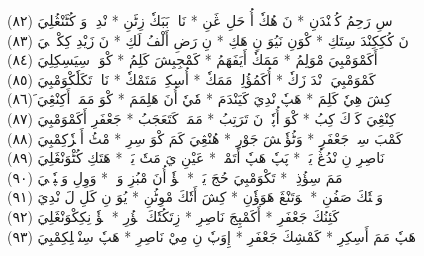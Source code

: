 \documentclass[a4paper, 10pt]{report}
\begin{document}
\begin{center}
\textarabic{(٨٢) \textcolor{mygreen}{سِ رَحِمُ كُئٖنْدَنِ  * نَ هُكٗ أُ حَلِ ڠَنِ  * نَاءٖ بَبَكٗ زِٹَنِ  * نْدِيٖ وَ كُٹَنْڠُلِيَ }} 
\\[5mm] 

\textarabic{(٨٣) \textcolor{mygreen}{نَ كُكِكِنْدَ سِتَكِ  * كْوَنِ نَيُوَ نِ هَكِ  * نِ رَضِ أَلْفُ لَكِ  * نَ زَيْدِ كِكْوٖٹٖيَ }} 
\\[5mm] 

\textarabic{(٨٤) \textcolor{mygreen}{أَكَمْوَمْبِيَ مْوَلِمُ  * مَمَكٗ أَيَفَهَمُ  * كَمْجِبِشَ كَلِمُ  * كْوَكٖ سِيَسِكِلِيَ }} 
\\[5mm] 

\textarabic{(٨٥) \textcolor{mygreen}{كَمْوَمْبِيَ إٖنْدَ زَكٗ  * أُكَمُؤُلِزٖ مَمَكٗ  * أُسِكِزٖ مَتَمْكٗ  * نَاءٖ تَكَلٗكْوَمْبِيَ }} 
\\[5mm] 

\textarabic{(٨٦) \textcolor{mygreen}{َكِشَ هِيٗ كَلِمَ  * هَپٗ نْدِيَ كَيَنْدَمَ  * مٗيٗ أُنَ هَلِمَمَ  * كْوَ مَمَكٖ أَكِنْڠِيَ }} 
\\[5mm] 

\textarabic{(٨٧) \textcolor{mygreen}{كِنْڠِيَ كَوٖكَ كِبُ  * كْوَ أُپٗلٖ نَ تَرَتِبُ  * مَمَكٖ كَتَعَجَبُ  * جَعْفَرِ أَكَمْوَمْبِيَ }} 
\\[5mm] 

\textarabic{(٨٨) \textcolor{mygreen}{كَمْبَ سِوٖ جَعْفَرِ  * وَٹُؤٗنٖشَ جَوْرِ  * هُنْڠِيَ كَمَ كْوَ سِرِ  * مْٹُ أَمٖزٗكِمْبِيَ }} 
\\[5mm] 

\textarabic{(٨٩) \textcolor{mygreen}{نَاصِرِ نِ نْدُڠُ يَكٖ  * پَپٗ هَپٗ أَتَمْكٖ  * عَيْنِ يَ مَتٗ يَكٖ  * هَتَكِ كُٹْوَنْڠَلِيَ }} 
\\[5mm] 

\textarabic{(٩٠) \textcolor{mygreen}{إٖوٖ مَمَ سِؤُذِكٖ  * تَكْوَمْبِيَ حُجَ يَكٖ  * يٖؤٗ أُنَ مْبُزِ وَكٖ  * وَوِلِ وَمٖپٗتٖيَ }} 
\\[5mm] 

\textarabic{(٩١) \textcolor{mygreen}{وَمٖتٗكَ صَفُنِ  * مٖوَتَنْڠَ هَوَؤٗنِ  * كِشَ أَتٗكَ مْوِٹُنِ  * يُوَ نِ كَلِ لَ نْدِيَ }} 
\\[5mm] 

\textarabic{(٩٢) \textcolor{mygreen}{كَئِنُكَ جَعْفَرِ  * أَكَمْپِجَ نَاصِرِ  * زِتَكُتٗكَ جٖؤُرِ  * يٖؤٗ نِكِكْوَنْڠَلِيَ }} 
\\[5mm] 

\textarabic{(٩٣) \textcolor{mygreen}{هَپٗ مَمَ أَسِكِرِ  * كَمْشِكَ جَعْفَرِ  * إِوَپٗ نِ مِيْ نَاصِرِ  * هَپٗ سِنْڠٖلِكِمْبِيَ }} 
\\[5mm] 


\end{center}
\end{document}

